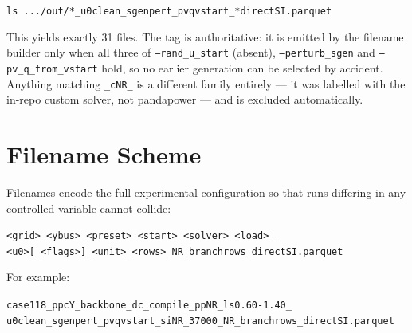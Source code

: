 \documentclass{article}
\begin{document}
\begin{center}
\texttt{ls .../out/*\_u0clean\_sgenpert\_pvqvstart\_*directSI.parquet}
\end{center}

\noindent
This yields exactly 31 files.  The tag is authoritative: it is emitted by the
filename builder only when all three of \texttt{--rand\_u\_start} (absent),
\texttt{--perturb\_sgen} and \texttt{--pv\_q\_from\_vstart} hold, so no earlier
generation can be selected by accident.  Anything matching \texttt{\_cNR\_} is a
different family entirely --- it was labelled with the in-repo custom solver,
not pandapower --- and is excluded automatically.


\section{Filename Scheme}

Filenames encode the full experimental configuration so that runs differing in
any controlled variable cannot collide:

\begin{center}
\small
\texttt{<grid>\_<ybus>\_<preset>\_<start>\_<solver>\_<load>\_}\\
\texttt{<u0>[\_<flags>]\_<unit>\_<rows>\_NR\_branchrows\_directSI.parquet}
\end{center}

\noindent
For example:

\begin{center}
\scriptsize
\texttt{case118\_ppcY\_backbone\_dc\_compile\_ppNR\_ls0.60-1.40\_}\\
\texttt{u0clean\_sgenpert\_pvqvstart\_siNR\_37000\_NR\_branchrows\_directSI.parquet}
\end{center}
\end{document}
